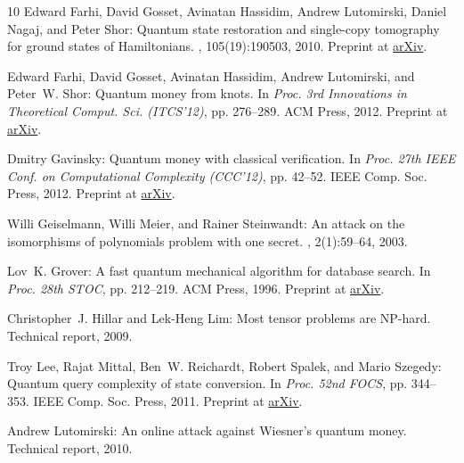 \begin{thebibliography}{10}
{\sc Edward Farhi, David Gosset, Avinatan Hassidim, Andrew Lutomirski, Daniel
  Nagaj, and Peter Shor}: Quantum state restoration and single-copy tomography
  for ground states of {H}amiltonians.
, 105(19):190503, 2010.
\newblock Preprint at \href{http://arxiv.org/abs/0912.3823}{arXiv}.

{\sc Edward Farhi, David Gosset, Avinatan Hassidim, Andrew Lutomirski, and
  Peter~W. Shor}: Quantum money from knots.
\newblock In {\em Proc. 3rd Innovations in Theoretical Comput. Sci. (ITCS'12)},
  pp. 276--289. ACM Press, 2012.
\newblock Preprint at \href{http://arxiv.org/abs/1004.5127}{arXiv}.
\newblock [\epfmtdoi{10.1145/2090236.2090260}]

{\sc Dmitry Gavinsky}: Quantum money with classical verification.
\newblock In {\em Proc. 27th IEEE Conf. on Computational Complexity (CCC'12)},
  pp. 42--52. IEEE Comp. Soc. Press, 2012.
\newblock Preprint at \href{http://arxiv.org/abs/1109.0372}{arXiv}.

{\sc Willi Geiselmann, Willi Meier, and Rainer Steinwandt}: An attack on the
  isomorphisms of polynomials problem with one secret.
, 2(1):59--64, 2003.
\newblock [\epfmtdoi{10.1007/s10207-003-0025-5}]

{\sc Lov~K. Grover}: A fast quantum mechanical algorithm for database search.
\newblock In {\em Proc. 28th STOC}, pp. 212--219. ACM Press, 1996.
\newblock Preprint at \href{http://arxiv.org/abs/quant-ph/9605043}{arXiv}.
\newblock [\epfmtdoi{10.1145/237814.237866}]

{\sc Christopher~J. Hillar and Lek-Heng Lim}: Most tensor problems are
  {NP}-hard.
\newblock Technical report, 2009.

{\sc Troy Lee, Rajat Mittal, Ben~W. Reichardt, Robert Spalek, and Mario
  Szegedy}: Quantum query complexity of state conversion.
\newblock In {\em Proc. 52nd FOCS}, pp. 344--353. IEEE Comp. Soc. Press, 2011.
\newblock Preprint at \href{http://arxiv.org/abs/1011.3020}{arXiv}.

{\sc Andrew Lutomirski}: An online attack against {W}iesner's quantum money.
\newblock Technical report, 2010.


\end{thebibliography}
